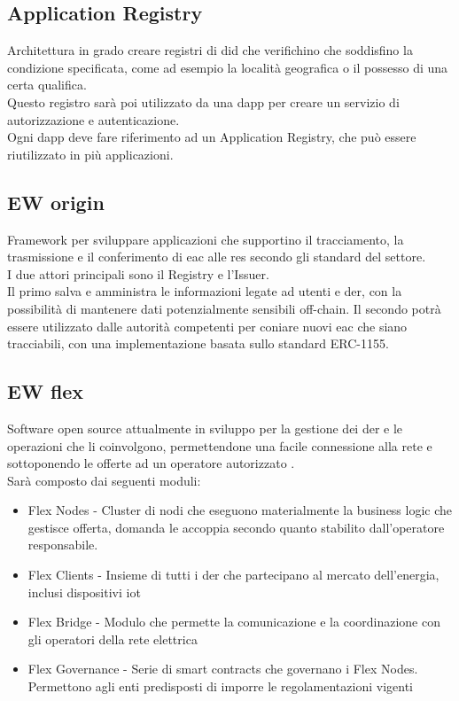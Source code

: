 \subsection{Application Registry}
Architettura in grado creare registri di \gls{did} che verifichino che soddisfino la condizione specificata, come ad esempio la località geografica o il possesso di una certa qualifica.\\
Questo registro sarà poi utilizzato da una \gls{dapp} per creare un servizio di autorizzazione e autenticazione. \\
Ogni \gls{dapp} deve fare riferimento ad un Application Registry, che può essere riutilizzato in più applicazioni.

\subsection{EW origin}
Framework per sviluppare applicazioni che supportino il tracciamento, la trasmissione e il conferimento di \gls{eac} alle \gls{res} secondo gli standard del settore. \\
I due attori principali sono il Registry e l'Issuer. \\
Il primo salva e amministra le informazioni legate ad utenti e \gls{der}, con la possibilità di mantenere dati potenzialmente sensibili off-chain.
Il secondo potrà essere utilizzato dalle autorità competenti per coniare nuovi \gls{eac} che siano tracciabili, con una implementazione basata sullo standard ERC-1155.

\subsection{EW flex}
Software open source attualmente in sviluppo per la gestione dei \gls{der} e le operazioni che li coinvolgono, 
permettendone una facile connessione alla rete e sottoponendo le offerte ad un operatore autorizzato \cite{art:ew-dos}. \\
Sarà composto dai seguenti moduli:

\begin{itemize}
    \item Flex Nodes - Cluster di nodi che eseguono materialmente la business logic che gestisce offerta, domanda le accoppia secondo quanto stabilito dall'operatore responsabile.
    \item Flex Clients - Insieme di tutti i \gls{der} che partecipano al mercato dell'energia, inclusi dispositivi \gls{iot}
    \item Flex Bridge - Modulo che permette la comunicazione e la coordinazione con gli operatori della rete elettrica
    \item Flex Governance - Serie di smart contracts che governano i Flex Nodes. Permettono agli enti predisposti di imporre le regolamentazioni vigenti
\end{itemize}